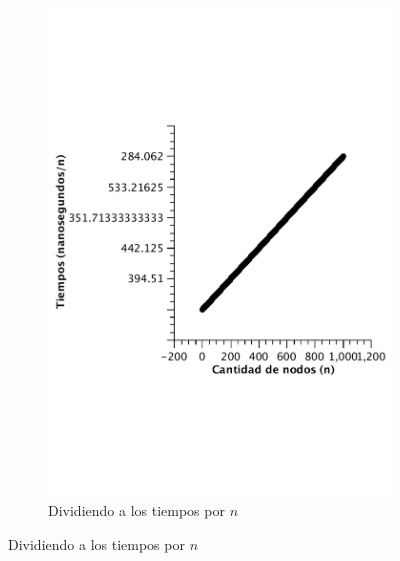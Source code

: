 \begin{figure}[H]
        \begin{subfigure}[b]{0.5\textwidth}
                \includegraphics[width=\textwidth]{imagenes/vacio-listas-2.pdf}
                \caption{Dividiendo a los tiempos por $n$}
        \end{subfigure}


\end{figure}

